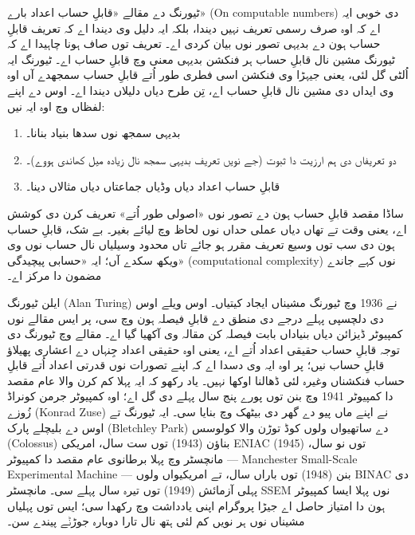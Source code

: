 \documentclass[../../../include/open-logic-section]{subfiles}
\begin{document}
\begin{digress}
ٹیورنگ دے مقالے
«قابلِ حساب اعداد بارے» (On computable numbers)
دی خوبی ایہ اے کہ
اوہ صرف رسمی تعریف
نہیں دیندا، بلکہ ایہ
دلیل وی دیندا اے
کہ تعریف قابلِ حساب ہون دے
بدیہی تصور نوں بیان کردی اے۔ تعریف توں
صاف ہونا چاہیدا اے
کہ ٹیورنگ مشین نال
قابلِ حساب ہر فنکشن
بدیہی معنی وچ قابلِ
حساب اے۔ ٹیورنگ
ایہ اُلٹی گل لئی،
یعنی جیہڑا وی فنکشن
اسی فطری طور اُتے
قابلِ حساب سمجھدے
آں اوہ وی ایداں
دی مشین نال قابلِ
حساب اے، تِن طرح
دیاں دلیلاں دیندا
اے۔ اوس دے اپنے
لفظاں وچ اوہ ایہ نیں:
\begin{enumerate}
\item بدیہی سمجھ نوں سدھا بنیاد بنانا۔
\item دو تعریفاں دی ہم ارزیت
  دا ثبوت (جے نویں تعریف
  بدیہی سمجھ نال زیادہ میل کھاندی ہووے)۔
\item قابلِ حساب اعداد دیاں وڈیاں جماعتاں دیاں مثالاں دینا۔
\end{enumerate}
ساڈا مقصد قابلِ حساب ہون
دے تصور نوں «اصولی
طور اُتے» تعریف کرن
دی کوشش اے، یعنی
وقت تے تھاں دیاں
عملی حداں نوں لحاظ
وچ لیائے بغیر۔ بے شک،
قابلِ حساب ہون دی سب توں وسیع
تعریف مقرر ہو جائے تاں محدود
وسیلیاں نال حساب نوں
وی ویکھ سکدے آں؛
ایہ «حسابی پیچیدگی»
(computational complexity)
نوں کہے جاندے
مضمون دا مرکز اے۔
\end{digress}

\begin{history}
ایلن ٹیورنگ (Alan Turing)
نے 1936 وچ ٹیورنگ
مشیناں ایجاد کیتیاں۔
اوس ویلے اوس دی
دلچسپی پہلے درجے دی
منطق دے قابلِ فیصلہ
ہون وچ سی، پر ایس
مقالے نوں کمپیوٹر
ڈیزائن دیاں بنیاداں
بابت فیصلہ کن مقالہ
وی آکھیا گیا اے۔
مقالے وچ ٹیورنگ دی
توجہ قابلِ حساب
حقیقی اعداد اُتے
اے، یعنی اوہ حقیقی
اعداد جِنہاں دے
اعشاری پھیلاؤ قابلِ
حساب نیں؛ پر اوہ
ایہ وی دسدا اے
کہ اپنے تصورات نوں
قدرتی اعداد اُتے
قابلِ حساب فنکشناں
وغیرہ لئی ڈھالنا
اوکھا نہیں۔ یاد رکھو
کہ ایہ پہلا کم کرن
والا عام مقصد دا
کمپیوٹر 1941 وچ
بنن توں پورے پنج
سال پہلے دی گل اے؛
اوہ کمپیوٹر جرمن
کونراڈ زُوزے (Konrad Zuse)
نے اپنے ماں پیو دے گھر دی
بیٹھک وچ بنایا سی۔ ایہ
ٹیورنگ تے اوس دے
بلیچلے پارک (Bletchley Park)
دے ساتھیواں ولوں
کوڈ توڑن والا کولوسس
(Colossus) بناؤن
(1943) توں ست سال،
امریکی ENIAC (1945)
توں نو سال، مانچسٹر
وچ پہلا برطانوی
عام مقصد دا کمپیوٹر
— Manchester Small-Scale
Experimental Machine —
بنن (1948) توں باراں
سال، تے امریکیواں
ولوں BINAC دی پہلی
آزمائش (1949) توں
تیرہ سال پہلے سی۔
مانچسٹر SSEM نوں
پہلا ایسا کمپیوٹر
ہون دا امتیاز حاصل
اے جیڑا پروگرام
اپنی یادداشت وچ
رکھدا سی؛ ایس توں
پہلیاں مشیناں نوں
ہر نویں کم لئی
ہتھ نال تارا دوبارہ
جوڑݨے پیندے سن۔
\end{history}
\end{document}
